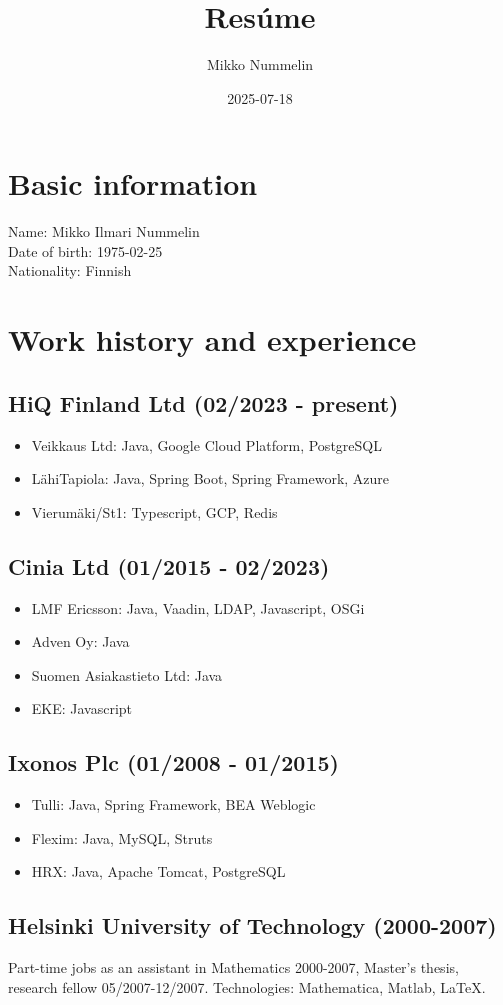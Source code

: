 \documentclass[a4paper,12pt]{article}
\title{Resúme}
\author{Mikko Nummelin}
\date{2025-07-18}
\begin{document}
\maketitle
\section*{Basic information}
Name: Mikko Ilmari Nummelin \\
Date of birth: 1975-02-25 \\
Nationality: Finnish
\section*{Work history and experience}
\subsection*{HiQ Finland Ltd (02/2023 - present)}
\begin{itemize}
\item{Veikkaus Ltd: Java, Google Cloud Platform, PostgreSQL}
\item{LähiTapiola: Java, Spring Boot, Spring Framework, Azure}
\item{Vierumäki/St1: Typescript, GCP, Redis}
\end{itemize}
\subsection*{Cinia Ltd (01/2015 - 02/2023)}
\begin{itemize}
\item{LMF Ericsson: Java, Vaadin, LDAP, Javascript, OSGi}
\item{Adven Oy: Java}
\item{Suomen Asiakastieto Ltd: Java}
\item{EKE: Javascript}
\end{itemize}
\subsection*{Ixonos Plc (01/2008 - 01/2015)}
\begin{itemize}
\item{Tulli: Java, Spring Framework, BEA Weblogic}
\item{Flexim: Java, MySQL, Struts}
\item{HRX: Java, Apache Tomcat, PostgreSQL}
\end{itemize}
\subsection*{Helsinki University of Technology (2000-2007)}
Part-time jobs as an assistant in Mathematics 2000-2007, Master's thesis, research fellow 05/2007-12/2007. Technologies: Mathematica, Matlab, LaTeX.
\end{document}
